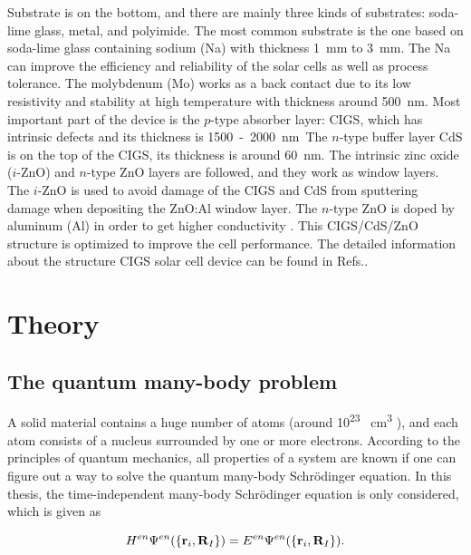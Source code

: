 \documentclass[a4paper, 12pt, titlepage,oneside,drop]{kthesis}
\begin{document}
Substrate is on the bottom, and there are mainly three kinds of substrates: soda-lime glass, metal, and polyimide. The most common substrate is the one based on soda-lime glass containing sodium (Na) with thickness 
\SI{1} {\mm} to \SI{3} {\mm}. The Na can improve the efficiency and reliability of the solar cells as well as process tolerance. The molybdenum (Mo) works as a back contact due to its low resistivity and stability at high 
temperature with thickness around \SI{500} {\nm}. Most important part of the device is the $p$-type absorber layer: CIGS, which has intrinsic defects and its thickness is \SI{1500} - \SI{2000} {\nm}. 
The $n$-type buffer layer CdS is on the top of the CIGS, its thickness is around \SI{60} {\nm}. The intrinsic zinc oxide ($i$-ZnO) and $n$-type ZnO layers are followed, and they work as window layers. The $i$-ZnO is used to 
avoid damage of the CIGS and CdS from sputtering damage when depositing the ZnO:Al window layer. The $n$-type ZnO is doped by aluminum (Al) in order to get higher conductivity \cite{kim1997structural, minami1984highly}. 
This CIGS/CdS/ZnO structure is optimized to improve the cell performance. The detailed information about the structure CIGS solar cell device can be found in Refs.\cite{naghavi2010buffer,niki2010cigs, kessler2001baseline}.







\section{Theory}
\label{ch:dft}

\subsection{The quantum many-body problem}
\label{ch:mb}

\noindent A solid material contains a huge number of atoms (around 10\textsuperscript{23} \si{\per\cubic\centi\metre} ), and each atom consists of a nucleus surrounded by one or more electrons. 
According to the principles of quantum mechanics, all properties of a system are known if one can figure out a way to solve 
the quantum many-body Schrödinger equation. In this thesis, the time-independent many-body Schrödinger equation is only considered, which is given as

\begin{equation}\label{ssth}
 H^{en} {\Psi^{en}(\{ {\textbf r}_{i}, {\textbf R}_{I} \})} = {E^{en}} {\Psi^{en}(\{ {\textbf r}_{i}, {\textbf R}_{I} \})}.
\end{equation}
\end{document}
